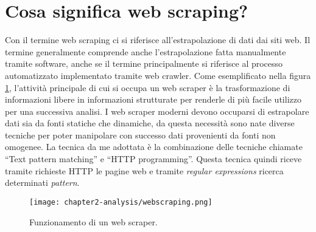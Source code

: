 \section{Cosa significa web scraping?}

Con il termine web scraping ci si riferisce all’estrapolazione di dati dai siti web. Il termine generalmente comprende anche l’estrapolazione fatta manualmente tramite software, anche se il termine principalmente si riferisce al processo automatizzato implementato tramite web crawler. Come esemplificato nella figura \ref{fig:funzionamento web scraper}, l’attività principale di cui si occupa un web scraper è la trasformazione di informazioni libere in informazioni strutturate per renderle di più facile utilizzo per una successiva analisi. I web scraper moderni devono occuparsi di estrapolare dati sia da fonti statiche che dinamiche, da questa necessità sono nate diverse tecniche per poter manipolare con successo dati provenienti da fonti non omogenee. La tecnica da me adottata è la combinazione delle tecniche chiamate ``Text pattern matching'' e ``HTTP programming''. Questa tecnica quindi riceve tramite richieste HTTP le pagine web e tramite \emph{regular expressions} ricerca determinati \emph{pattern}.

\begin{figure}[!h] 
    \centering 
    \texttt{[image: chapter2-analysis/webscraping.png]} 
    \caption{Funzionamento di un web scraper.}
    \label{fig:funzionamento web scraper}
\end{figure}

